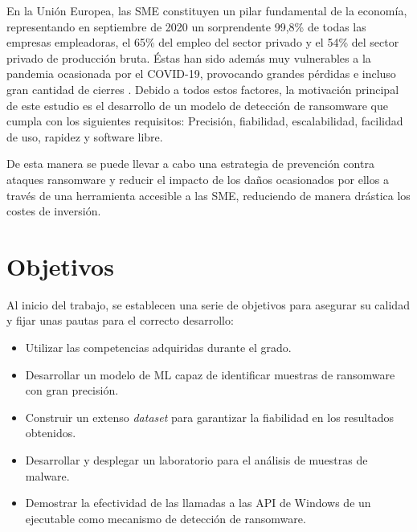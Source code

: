 En la Unión Europea, las \gls{SME} constituyen un pilar fundamental de la economía, representando en septiembre de 2020 un sorprendente 99,8\% de todas las empresas empleadoras, el 65\% del empleo del sector privado y el 54\% del sector privado de producción bruta. 
Éstas han sido además muy vulnerables a la pandemia ocasionada por el \gls{COVID-19}, provocando grandes pérdidas e incluso gran cantidad de cierres \cite{NBER}. 
Debido a todos estos factores, la motivación principal de este estudio es el desarrollo de un modelo de detección de ransomware que cumpla con los siguientes requisitos: Precisión, fiabilidad, escalabilidad, facilidad de uso, rapidez y software libre.

De esta manera se puede llevar a cabo una estrategia de prevención contra ataques ransomware y reducir el impacto de los daños ocasionados por ellos a través de una herramienta accesible a las \gls{SME}, reduciendo de manera drástica los costes de inversión.




\section{Objetivos}
\noindent Al inicio del trabajo, se establecen una serie de objetivos para asegurar su calidad y fijar unas pautas para el correcto desarrollo:
\begin{itemize}
    \item Utilizar las competencias adquiridas durante el grado.
    \item Desarrollar un modelo de \gls{ML} capaz de identificar muestras de ransomware con gran precisión.
    \item Construir un extenso \textit{dataset} para garantizar la fiabilidad en los resultados obtenidos. 
    \item Desarrollar y desplegar un laboratorio para el análisis de muestras de malware.
    \item Demostrar la efectividad de las llamadas a las \gls{API} de Windows de un ejecutable como mecanismo de detección de ransomware. %
\end{itemize}


